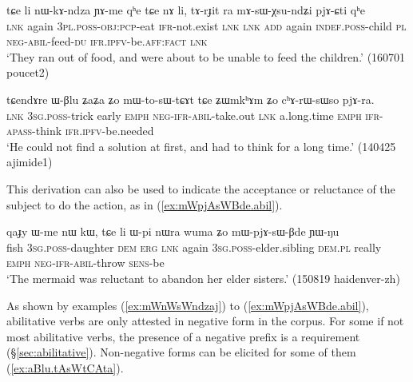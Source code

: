   \begin{exe}
\ex \label{ex:mAsWXsundZi}
 \gll   tɕe li nɯ-kɤ-ndza ɲɤ-me qʰe tɕe nɤ li, tɤ-rɟit ra mɤ-sɯ-χsu-ndʑi pjɤ-ɕti qʰe \\
 \textsc{lnk} again \textsc{3pl}.\textsc{poss}-\textsc{obj}:\textsc{pcp}-eat \textsc{ifr}-not.exist \textsc{lnk} \textsc{lnk} \textsc{add} again \textsc{indef}.\textsc{poss}-child \textsc{pl} \textsc{neg}-\textsc{abil}-feed-\textsc{du} \textsc{ifr}.\textsc{ipfv}-be.\textsc{aff}:\textsc{fact} \textsc{lnk} \\
\glt `They ran out of food, and were about to be unable to feed the children.' (160701 poucet2) 
  \end{exe}
  

 \begin{exe}
\ex \label{ex:WBlu.mWtosWtCAt}
 \gll   tɕendɤre ɯ-βlu ʑaʑa ʑo mɯ-to-sɯ-tɕɤt tɕe ʑɯmkʰɤm ʑo cʰɤ-rɯ-sɯso pjɤ-ra. \\
\textsc{lnk}  \textsc{3sg}.\textsc{poss}-trick early \textsc{emph} \textsc{neg}-\textsc{ifr}-\textsc{abil}-take.out \textsc{lnk} a.long.time \textsc{emph} \textsc{ifr}-\textsc{apass}-think \textsc{ifr}.\textsc{ipfv}-be.needed \\
\glt `He could not find a solution at first, and had to think for a long time.' (140425 ajimide1)
 \end{exe}
 
 This derivation can also be used to indicate the acceptance or reluctance of the subject to do the action, as in (\ref{ex:mWpjAsWBde.abil}). 
 
\begin{exe}
\ex \label{ex:mWpjAsWBde.abil}
 \gll  qaɟy ɯ-me nɯ kɯ, tɕe li ɯ-pi nɯra wuma ʑo mɯ-pjɤ-sɯ-βde ɲɯ-ŋu  \\
 fish \textsc{3sg}.\textsc{poss}-daughter \textsc{dem} \textsc{erg} \textsc{lnk} again \textsc{3sg}.\textsc{poss}-elder.sibling \textsc{dem}.\textsc{pl} really \textsc{emph} \textsc{neg}-\textsc{ifr}-\textsc{abil}-throw \textsc{sens}-be \\
 \glt `The mermaid was reluctant to abandon her elder sisters.' (150819 haidenver-zh) 
\end{exe}  
 
 As shown by examples (\ref{ex:mWnWsWndzaj}) to (\ref{ex:mWpjAsWBde.abil}), abilitative verbs are only attested in negative form in the corpus. For some if not most abilitative verbs, the presence of a negative prefix is a requirement (§\ref{sec:abilitative}). Non-negative forms can be elicited for some of them (\ref{ex:aBlu.tAsWtCAta}).

